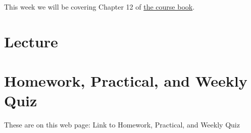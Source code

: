 \documentclass[
  letterpaper,
  8pt,
  a4paper]{book}
\begin{document}

This week we will be covering Chapter 12 of
\href{https://opetchey.github.io/BIO144_Course_Book/}{the course book}.

\section*{Lecture}\label{lecture-11}


\section*{Homework, Practical, and Weekly
Quiz}\label{homework-practical-and-weekly-quiz-11}


These are on this web page: Link to Homework, Practical, and Weekly Quiz


\backmatter
\end{document}
